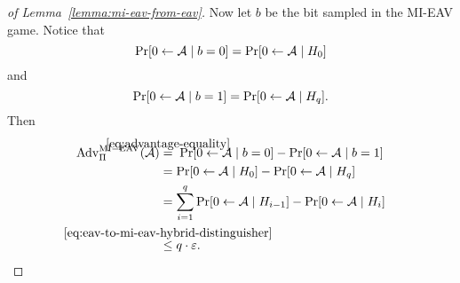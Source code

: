 \begin{proof}[of Lemma~\ref{lemma:mi-eav-from-eav}]
	Now let $b$ be the bit sampled in the MI-EAV game. Notice that
	\[
		\pr{0 \from \adv \mid b = 0} = \pr{0 \from \adv \mid H_0}
	\]
	and
	\[
		\pr{0 \from \adv \mid b = 1} = \pr{0 \from \adv \mid H_q}.
	\]
	Then
	\begin{align*}
		\mathrm{Adv}_{\Pi}^{\mathrm{MI-EAV}}(\adv) & \stackrel{\mathclap{\eqref{eq:advantage-equality}}}{=} \; \pr{0 \from \adv \mid b = 0} - \pr{0 \from \adv \mid b = 1} \\
		                                           & = \pr{0 \from \adv \mid H_0} - \pr{0 \from \adv \mid H_q}                                                             \\
		                                           & = \sum_{i = 1}^{q} \pr{0 \from \adv \mid H_{i - 1}} - \pr{0 \from \adv \mid H_i}                                      \\
		                                           & \stackrel{\mathclap{\eqref{eq:eav-to-mi-eav-hybrid-distinguisher}}}{\le} q \cdot \epsilon.
	\end{align*}
\end{proof}

